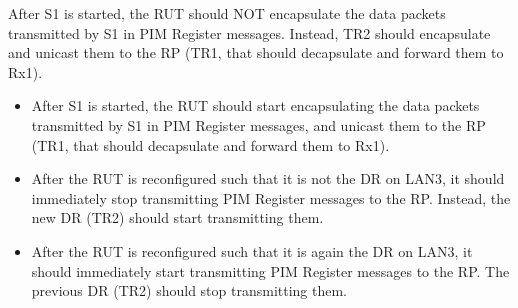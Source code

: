 \documentclass[11pt]{report}
\begin{document}

After S1 is started, the RUT should NOT encapsulate the
data packets transmitted by S1 in PIM Register messages. Instead, TR2 should
encapsulate and unicast them to the RP (TR1, that should decapsulate and
forward them to Rx1).


\begin{itemize}

  \item After S1 is started, the RUT should start
  encapsulating the data packets transmitted by S1 in PIM Register messages,
  and unicast them to the RP (TR1, that should decapsulate and forward them to
  Rx1).

  \item After the RUT is reconfigured such that it is not the DR on LAN3, it
  should immediately stop transmitting PIM Register messages to the RP.
  Instead, the new DR (TR2) should start transmitting them.

  \item After the RUT is reconfigured such that it is again the DR on LAN3, it
  should immediately start transmitting PIM Register messages to the RP.
  The previous DR (TR2) should stop transmitting them.

\end{itemize}

\end{document}

